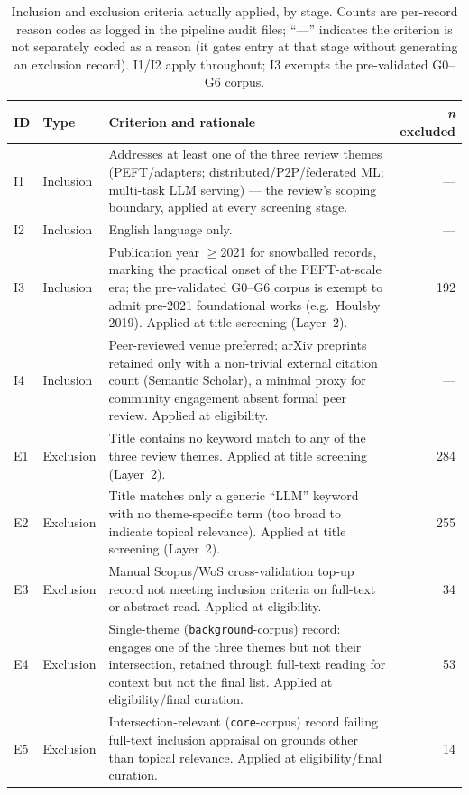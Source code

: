 \begin{table}[H]
\centering
\small
\caption{Inclusion and exclusion criteria actually applied, by stage. Counts
are per-record reason codes as logged in the pipeline audit files; ``---''
indicates the criterion is not separately coded as a reason (it gates entry
at that stage without generating an exclusion record). I1/I2 apply
throughout; I3 exempts the pre-validated G0--G6 corpus.}
\label{tab:inclusion_exclusion}
\begin{tabularx}{\textwidth}{@{} l l X r @{}}
\toprule
\textbf{ID} & \textbf{Type} & \textbf{Criterion and rationale} & \textbf{\textit{n} excluded} \\
\midrule
I1 & Inclusion & Addresses at least one of the three review themes (PEFT/adapters; distributed/P2P/federated ML; multi-task LLM serving) --- the review's scoping boundary, applied at every screening stage. & --- \\
I2 & Inclusion & English language only. & --- \\
I3 & Inclusion & Publication year $\geq$2021 for snowballed records, marking the practical onset of the PEFT-at-scale era; the pre-validated G0--G6 corpus is exempt to admit pre-2021 foundational works (e.g.\ Houlsby 2019). Applied at title screening (Layer~2). & 192 \\
I4 & Inclusion & Peer-reviewed venue preferred; arXiv preprints retained only with a non-trivial external citation count (Semantic Scholar), a minimal proxy for community engagement absent formal peer review. Applied at eligibility. & --- \\
E1 & Exclusion & Title contains no keyword match to any of the three review themes. Applied at title screening (Layer~2). & 284 \\
E2 & Exclusion & Title matches only a generic ``LLM'' keyword with no theme-specific term (too broad to indicate topical relevance). Applied at title screening (Layer~2). & 255 \\
E3 & Exclusion & Manual Scopus/WoS cross-validation top-up record not meeting inclusion criteria on full-text or abstract read. Applied at eligibility. & 34 \\
E4 & Exclusion & Single-theme (\texttt{background}-corpus) record: engages one of the three themes but not their intersection, retained through full-text reading for context but not the final list. Applied at eligibility/final curation. & 53 \\
E5 & Exclusion & Intersection-relevant (\texttt{core}-corpus) record failing full-text inclusion appraisal on grounds other than topical relevance. Applied at eligibility/final curation. & 14 \\
\bottomrule
\end{tabularx}
\end{table}


